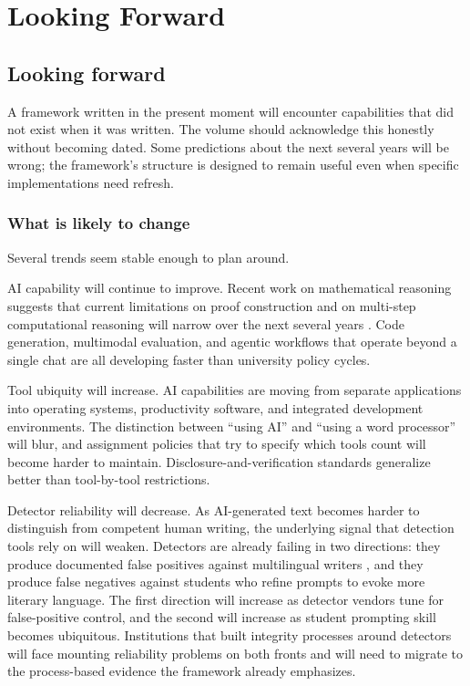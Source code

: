 \documentclass{SIAMbook2023}
\begin{document}
\chapter{Looking Forward}
\label{u:ch:looking-forward}%

\section{Looking forward}
\label{u:sec:looking-forward}%

A framework written in the present moment will encounter capabilities that did not exist when it was written. The volume should acknowledge this honestly without becoming dated. Some predictions about the next several years will be wrong; the framework's structure is designed to remain useful even when specific implementations need refresh.

\subsection{What is likely to change}
\label{u:subsec:will-change}

Several trends seem stable enough to plan around.

AI capability will continue to improve. Recent work on mathematical reasoning suggests that current limitations on proof construction and on multi-step computational reasoning will narrow over the next several years \citep{ahn2024large}. Code generation, multimodal evaluation, and agentic workflows that operate beyond a single chat are all developing faster than university policy cycles.

Tool ubiquity will increase. AI capabilities are moving from separate applications into operating systems, productivity software, and integrated development environments. The distinction between ``using AI'' and ``using a word processor'' will blur, and assignment policies that try to specify which tools count will become harder to maintain. Disclosure-and-verification standards generalize better than tool-by-tool restrictions.

Detector reliability will decrease. As AI-generated text becomes harder to distinguish from competent human writing, the underlying signal that detection tools rely on will weaken. Detectors are already failing in two directions: they produce documented false positives against multilingual writers \citep{liang2023gpt}, and they produce false negatives against students who refine prompts to evoke more literary language. The first direction will increase as detector vendors tune for false-positive control, and the second will increase as student prompting skill becomes ubiquitous. Institutions that built integrity processes around detectors will face mounting reliability problems on both fronts and will need to migrate to the process-based evidence the framework already emphasizes.
\end{document}
